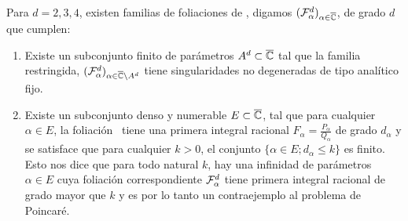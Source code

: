 \begin{TeoPrin}
\label{Teo:Prin}
Para $d = 2,3,4$, existen familias de foliaciones de \CP, digamos $(\Fol[d]{\alpha})_{\alpha\in\overline{\C}}$, de grado $d$ que cumplen:

\begin{enumerate}

\item Existe un subconjunto finito de parámetros $A^d\subset\overline{\C}$ tal que la familia restringida, $(\Fol[d]{\alpha})_{\alpha\in\overline{\C}\setminus A^d}$ tiene singularidades no degeneradas de tipo analítico fijo.

\item Existe un subconjunto denso y numerable $E\subset\overline{\C}$, tal que para cualquier $\alpha\in E$, la foliación \Fol[d]{\alpha}\ tiene una primera integral racional $F_{\alpha} = \tfrac{P_{\alpha}}{Q_{\alpha}}$ de grado $d_{\alpha}$ y se satisface que para cualquier $k>0$, el conjunto $\{\alpha\in E ; d_{\alpha}\leq k\}$ es finito. Esto nos dice que para todo natural $k$, hay una infinidad de parámetros $\alpha\in E$ cuya foliación correspondiente $\Fol[d]{\alpha}$ tiene primera integral racional de grado mayor que $k$ y es por lo tanto un contraejemplo al problema de Poincaré.

\end{enumerate}
\end{TeoPrin}





